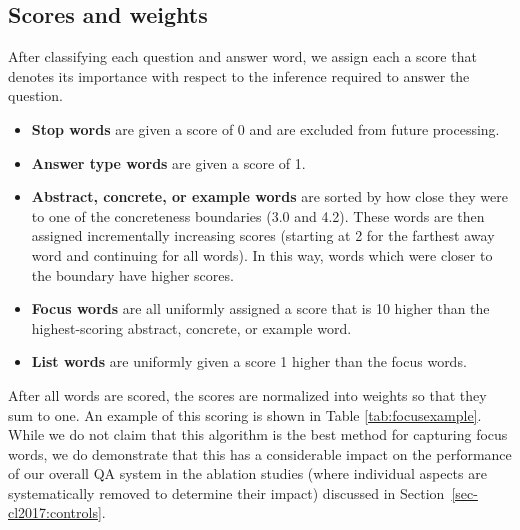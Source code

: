 \subsection{Scores and weights}

After classifying each question and answer word, we assign each a score that denotes its importance with respect to the inference required to answer the question.  
\begin{itemize}

\item \textbf{Stop words} are given a score of 0 and are excluded from future processing.

\item \textbf{Answer type words} are given a score of 1. 

\item \textbf{Abstract, concrete, or example words} are sorted by how close they were to one of the concreteness boundaries (3.0 and 4.2).  These words are then assigned incrementally increasing scores (starting at 2 for the farthest away word and continuing for all words).  In this way, words which were closer to the boundary have higher scores.

\item \textbf{Focus words} are all uniformly assigned a score that is 10 higher than the highest-scoring abstract, concrete, or example word.  

\item \textbf{List words} are uniformly given a score 1 higher than the focus words.
  
\end{itemize}

After all words are scored, the scores are normalized into weights so that they sum to one.  An example of this scoring is shown in Table \ref{tab:focusexample}.  While we do not claim that this algorithm is the best method for capturing focus words, we do demonstrate that this has a considerable impact on the performance of our overall QA system in the ablation studies (where individual aspects are systematically removed to determine their impact) discussed in Section~\ref{sec-cl2017:controls}.

